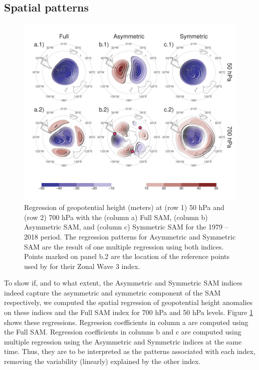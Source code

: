 \documentclass[]{ametsocV5}
\begin{document}
\hypertarget{spatial}{%
\subsection{Spatial patterns}\label{spatial}}

\begin{figure}
\includegraphics{2d-regr-1} \caption[Regression of geopotential height (meters) at (row 1) 50 hPa and (row 2) 700 hPa with the (column a) Full SAM, (column b) Asymmetric SAM, and (column c) Symmetric SAM for the 1979 -- 2018 period]{Regression of geopotential height (meters) at (row 1) 50 hPa and (row 2) 700 hPa with the (column a) Full SAM, (column b) Asymmetric SAM, and (column c) Symmetric SAM for the 1979 -- 2018 period. The regression patterns for Asymmetric and Symmetric SAM are the result of one multiple regression using both indices. Points marked on panel b.2 are the location of the reference points used by \cite{raphael2004} for their Zonal Wave 3 index. }\label{fig:2d-regr}
\end{figure}

To show if, and to what extent, the Asymmetric and Symmetric SAM indices indeed capture the asymmetric and symmetric component of the SAM respectively, we computed the spatial regression of geopotential height anomalies on these indices and the Full SAM index for 700 hPa and 50 hPa levels. Figure \ref{fig:2d-regr} shows these regressions. Regression coefficients in column a are computed using the Full SAM. Regression coefficients in columns b and c are computed using multiple regression using the Asymmetric and Symmetric indices at the same time. Thus, they are to be interpreted as the patterns associated with each index, removing the variability (linearly) explained by the other index.
\end{document}
